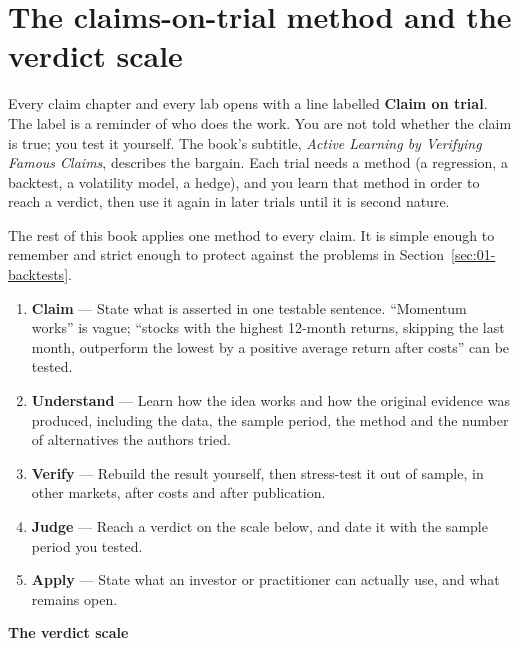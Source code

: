 \section{The claims-on-trial method and the verdict scale}
\label{sec:01-method}

Every claim chapter and every lab opens with a line labelled \textbf{Claim on trial}. The label is a reminder of who does the work. You are not told whether the claim is true; you test it yourself. The book's subtitle, \emph{Active Learning by Verifying Famous Claims}, describes the bargain. Each trial needs a method (a regression, a backtest, a volatility model, a hedge), and you learn that method in order to reach a verdict, then use it again in later trials until it is second nature.

The rest of this book applies one method to every claim. It is simple enough to remember and strict enough to protect against the problems in Section~\ref{sec:01-backtests}.

\begin{enumerate}
  \item \textbf{Claim} --- State what is asserted in one testable sentence. ``Momentum works'' is vague; ``stocks with the highest 12-month returns, skipping the last month, outperform the lowest by a positive average return after costs'' can be tested.
  \item \textbf{Understand} --- Learn how the idea works and how the original evidence was produced, including the data, the sample period, the method and the number of alternatives the authors tried.
  \item \textbf{Verify} --- Rebuild the result yourself, then stress-test it out of sample, in other markets, after costs and after publication.
  \item \textbf{Judge} --- Reach a verdict on the scale below, and date it with the sample period you tested.
  \item \textbf{Apply} --- State what an investor or practitioner can actually use, and what remains open.
\end{enumerate}

\textbf{The verdict scale}

